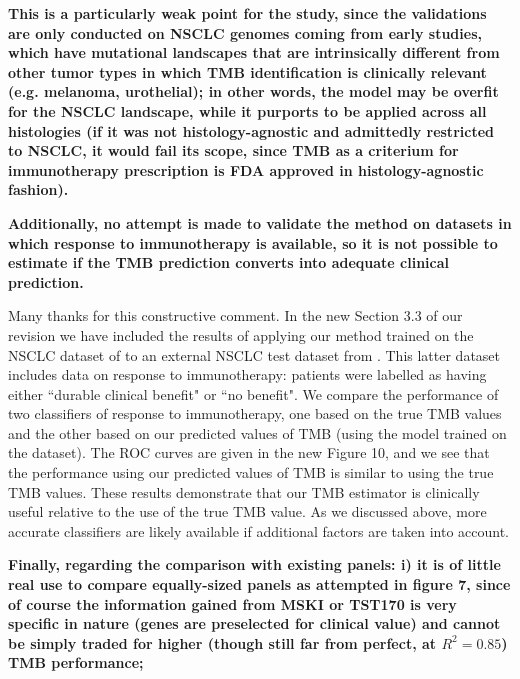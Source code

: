 \documentclass[12pt]{article}
\begin{document}
\textbf{This is a particularly weak point for the study, since the validations are only conducted on NSCLC genomes coming from early studies, which have mutational landscapes that are intrinsically different from other tumor types in which TMB identification is clinically relevant (e.g. melanoma, urothelial); in other words, the model may be overfit for the NSCLC landscape, while it purports to be applied across all histologies (if it was not histology-agnostic and admittedly restricted to NSCLC, it would fail its scope, since TMB as a criterium for immunotherapy prescription is FDA approved in histology-agnostic fashion).}



\textbf{Additionally, no attempt is made to validate the method on datasets in which response to immunotherapy is available, so it is not possible to estimate if the TMB prediction converts into adequate clinical prediction.}

Many thanks for this constructive comment. In the new Section 3.3 of our revision we have included the results of applying our method trained on the NSCLC dataset of \citet{campbell_distinct_2016} to an external NSCLC test dataset from \citet{hellmann_genomic_2018}.  This latter dataset includes data on response to immunotherapy: patients were labelled as having either ``durable clinical benefit" or ``no benefit".  We compare the performance of two classifiers of response to immunotherapy, one based on the true TMB values and the other based on our predicted values of TMB (using the model trained on the \citet{campbell_distinct_2016} dataset).  The ROC curves are given in the new Figure 10, and we see that the performance using our predicted values of TMB is similar to using the true TMB values. These results demonstrate that our TMB estimator is clinically useful relative to the use of the true TMB value. As we discussed above, more accurate classifiers are likely available if additional factors are taken into account. 

\textbf{Finally, regarding the comparison with existing panels: 
i) it is of little real use to compare equally-sized panels as attempted in figure 7, since of course the information gained from MSKI or TST170 is very specific in nature (genes are preselected for clinical value) and cannot be simply traded for higher (though still far from perfect, at $R^2=0.85$) TMB performance;}
\end{document}
